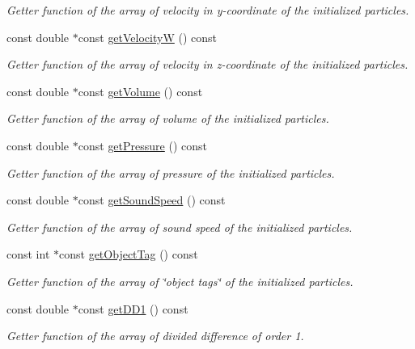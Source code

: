 \begin{DoxyCompactItemize}
\begin{DoxyCompactList}\small\item\em Getter function of the array of velocity in y-\/coordinate of the initialized particles. \end{DoxyCompactList}\item 
const double $\ast$const \hyperlink{classParticleData_a35e82fba85a274782a3485bf99888635}{get\-Velocity\-W} () const 
\begin{DoxyCompactList}\small\item\em Getter function of the array of velocity in z-\/coordinate of the initialized particles. \end{DoxyCompactList}\item 
const double $\ast$const \hyperlink{classParticleData_a27b7864577ba44978a48a8587e9854ac}{get\-Volume} () const 
\begin{DoxyCompactList}\small\item\em Getter function of the array of volume of the initialized particles. \end{DoxyCompactList}\item 
const double $\ast$const \hyperlink{classParticleData_a3713fca18cdeba32c17a244a62dcafdd}{get\-Pressure} () const 
\begin{DoxyCompactList}\small\item\em Getter function of the array of pressure of the initialized particles. \end{DoxyCompactList}\item 
const double $\ast$const \hyperlink{classParticleData_a493cb98a9d33fc3bd48fc879456a426c}{get\-Sound\-Speed} () const 
\begin{DoxyCompactList}\small\item\em Getter function of the array of sound speed of the initialized particles. \end{DoxyCompactList}\item 
const int $\ast$const \hyperlink{classParticleData_abb5cbc18cc19ba33786fabdb6b6bf8be}{get\-Object\-Tag} () const 
\begin{DoxyCompactList}\small\item\em Getter function of the array of \char`\"{}object tags\char`\"{} of the initialized particles. \end{DoxyCompactList}\item 
const double $\ast$const \hyperlink{classParticleData_a0571f782e53d0e83a6302a83508863dd}{get\-D\-D1} () const 
\begin{DoxyCompactList}\small\item\em Getter function of the array of divided difference of order 1. \end{DoxyCompactList}\item 

\end{DoxyCompactItemize}
